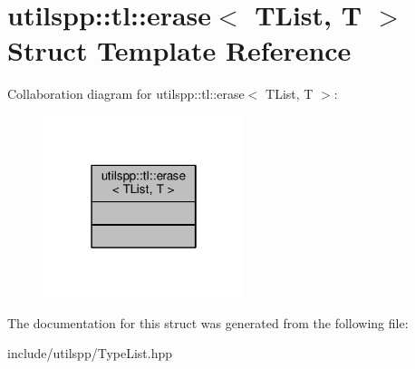 \hypertarget{structutilspp_1_1tl_1_1erase}{\section{utilspp\-:\-:tl\-:\-:erase$<$ T\-List, T $>$ Struct Template Reference}
\label{structutilspp_1_1tl_1_1erase}
}


Collaboration diagram for utilspp\-:\-:tl\-:\-:erase$<$ T\-List, T $>$\-:
\nopagebreak
\begin{figure}[H]
\begin{center}
\leavevmode
\includegraphics[width=166pt]{structutilspp_1_1tl_1_1erase__coll__graph}
\end{center}
\end{figure}


The documentation for this struct was generated from the following file\-:\begin{DoxyCompactItemize}
\item 
include/utilspp/Type\-List.\-hpp\end{DoxyCompactItemize}
